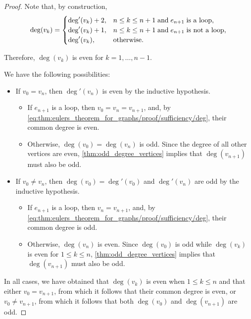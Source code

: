 \begin{proof}
  Note that, by construction,
  \begin{equation}\label{eq:thm:eulers_theorem_for_graphs/proof/sufficiency/deg}
    \deg(v_k) = \begin{cases}
      \deg'(v_k) + 2, &n \leq k \leq n + 1 \T{and} e_{n+1} \T{is a loop}, \\
      \deg'(v_k) + 1, &n \leq k \leq n + 1 \T{and} e_{n+1} \T{is not a loop}, \\
      \deg'(v_k),     &\T{otherwise.}
    \end{cases}
  \end{equation}

  Therefore, \( \deg(v_k) \) is even for \( k = 1, \ldots, n - 1 \).

  We have the following possibilities:
  \begin{itemize}
    \item If \( v_0 = v_n \), then \( \deg'(v_n) \) is even by the inductive hypothesis.
    \begin{itemize}
      \item If \( e_{n+1} \) is a loop, then \( v_0 = v_n = v_{n+1} \), and, by \eqref{eq:thm:eulers_theorem_for_graphs/proof/sufficiency/deg}, their common degree is even.

      \item Otherwise, \( \deg(v_0) = \deg(v_n) \) is odd. Since the degree of all other vertices are even, \cref{thm:odd_degree_vertices} implies that \( \deg(v_{n+1}) \) must also be odd.
    \end{itemize}

    \item If \( v_0 \neq v_n \), then \( \deg(v_0) = \deg'(v_0) \) and \( \deg'(v_n) \) are odd by the inductive hypothesis.
    \begin{itemize}
      \item If \( e_{n+1} \) is a loop, then \( v_n = v_{n+1} \), and, by \eqref{eq:thm:eulers_theorem_for_graphs/proof/sufficiency/deg}, their common degree is odd.

      \item Otherwise, \( \deg(v_n) \) is even. Since \( \deg(v_0) \) is odd while \( \deg(v_k) \) is even for \( 1 \leq k \leq n \), \cref{thm:odd_degree_vertices} implies that \( \deg(v_{n+1}) \) must also be odd.
    \end{itemize}
  \end{itemize}

  In all cases, we have obtained that \( \deg(v_k) \) is even when \( 1 \leq k \leq n \) and that either \( v_0 = v_{n+1} \), from which it follows that their common degree is even, or \( v_0 \neq v_{n+1} \), from which it follows that both \( \deg(v_0) \) and \( \deg(v_{n+1}) \) are odd.


\end{proof}

